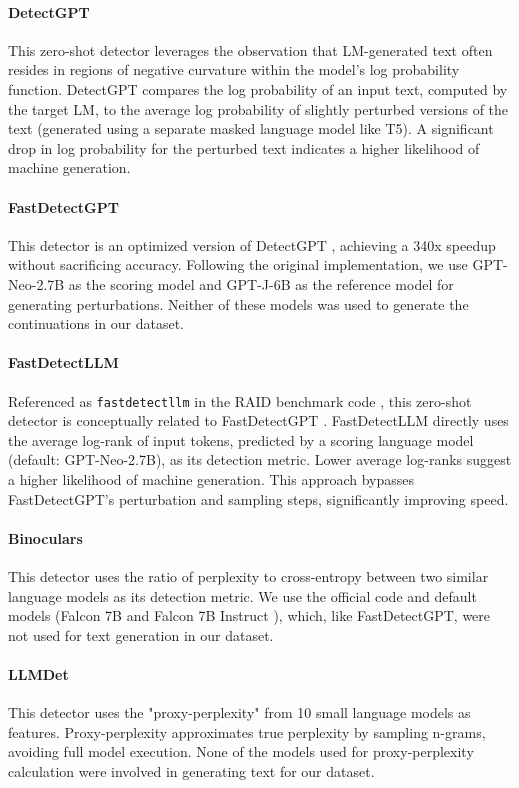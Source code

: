 \paragraph{DetectGPT} \cite{mitchell-etal-2023-detectgpt} This zero-shot detector leverages the observation that LM-generated text often resides in regions of negative curvature within the model's log probability function. DetectGPT compares the log probability of an input text, computed by the target LM, to the average log probability of slightly perturbed versions of the text (generated using a separate masked language model like T5). A significant drop in log probability for the perturbed text indicates a higher likelihood of machine generation.

\paragraph{FastDetectGPT} \cite{bao2023fastdetectgpt} This detector is an optimized version of DetectGPT \cite{mitchell-etal-2023-detectgpt}, achieving a 340x speedup without sacrificing accuracy.  Following the original implementation, we use GPT-Neo-2.7B as the scoring model and GPT-J-6B as the reference model for generating perturbations.  Neither of these models was used to generate the continuations in our dataset.


\paragraph{FastDetectLLM}  Referenced as \texttt{fastdetectllm} in the RAID benchmark code \citep{dugan2024raidsharedbenchmarkrobust}, this zero-shot detector is conceptually related to FastDetectGPT \cite{mitchell-etal-2023-detectgpt}.  FastDetectLLM directly uses the average log-rank of input tokens, predicted by a scoring language model (default: GPT-Neo-2.7B), as its detection metric. Lower average log-ranks suggest a higher likelihood of machine generation. This approach bypasses FastDetectGPT's perturbation and sampling steps, significantly improving speed.


\paragraph{Binoculars} \cite{hans2024spotting} This detector uses the ratio of perplexity to cross-entropy between two similar language models as its detection metric. We use the official code and default models (Falcon 7B and Falcon 7B Instruct \cite{almazrouei2023falcon}), which, like FastDetectGPT, were not used for text generation in our dataset.

\paragraph{LLMDet} \cite{wu-etal-2023-llmdet} This detector uses the "proxy-perplexity" from 10 small language models as features. Proxy-perplexity approximates true perplexity by sampling n-grams, avoiding full model execution. None of the models used for proxy-perplexity calculation were involved in generating text for our dataset.